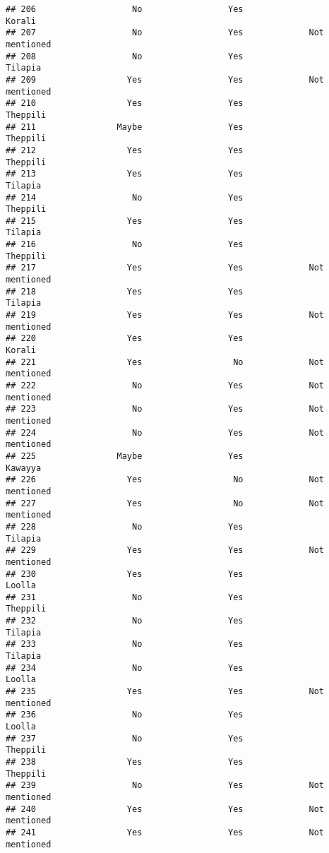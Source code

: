 \documentclass[
]{article}
\begin{document}
\begin{verbatim}
## 206                   No                 Yes                    Korali
## 207                   No                 Yes             Not mentioned
## 208                   No                 Yes                  Tilapia 
## 209                  Yes                 Yes             Not mentioned
## 210                  Yes                 Yes                 Theppili 
## 211                Maybe                 Yes                 Theppili 
## 212                  Yes                 Yes                 Theppili 
## 213                  Yes                 Yes                  Tilapia 
## 214                   No                 Yes                 Theppili 
## 215                  Yes                 Yes                  Tilapia 
## 216                   No                 Yes                 Theppili 
## 217                  Yes                 Yes             Not mentioned
## 218                  Yes                 Yes                  Tilapia 
## 219                  Yes                 Yes             Not mentioned
## 220                  Yes                 Yes                   Korali 
## 221                  Yes                  No             Not mentioned
## 222                   No                 Yes             Not mentioned
## 223                   No                 Yes             Not mentioned
## 224                   No                 Yes             Not mentioned
## 225                Maybe                 Yes                   Kawayya
## 226                  Yes                  No             Not mentioned
## 227                  Yes                  No             Not mentioned
## 228                   No                 Yes                  Tilapia 
## 229                  Yes                 Yes             Not mentioned
## 230                  Yes                 Yes                   Loolla 
## 231                   No                 Yes                 Theppili 
## 232                   No                 Yes                  Tilapia 
## 233                   No                 Yes                  Tilapia 
## 234                   No                 Yes                   Loolla 
## 235                  Yes                 Yes             Not mentioned
## 236                   No                 Yes                   Loolla 
## 237                   No                 Yes                 Theppili 
## 238                  Yes                 Yes                 Theppili 
## 239                   No                 Yes             Not mentioned
## 240                  Yes                 Yes             Not mentioned
## 241                  Yes                 Yes             Not mentioned

\end{verbatim}
\end{document}
